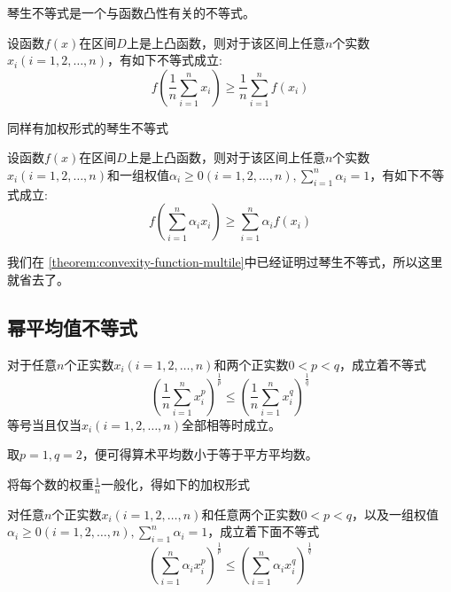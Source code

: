 琴生不等式是一个与函数凸性有关的不等式。
\begin{theorem}[琴生不等式]
  设函数$f(x)$在区间$D$上是上凸函数，则对于该区间上任意$n$个实数$x_i(i=1,2,\ldots,n)$，有如下不等式成立:
  \begin{equation}
    \label{eq:jenson-inequality-some-import-inequality}
    f \left( \frac{1}{n} \sum_{i=1}^nx_i \right) \geqslant
    \frac{1}{n} \sum_{i=1}^n f(x_i)
  \end{equation}
\end{theorem}

同样有加权形式的琴生不等式
\begin{theorem}[加权形式的琴生不等式]
  设函数$f(x)$在区间$D$上是上凸函数，则对于该区间上任意$n$个实数$x_i(i=1,2,\ldots,n)$和一组权值$\alpha_i\geqslant 0(i=1,2,\ldots,n), \sum_{i=1}^n\alpha_i=1$，有如下不等式成立:
  \begin{equation}
    \label{eq:jenson-inequality-with-weight}
    f \left( \sum_{i=1}^n\alpha_ix_i \right) \geqslant
    \sum_{i=1}^n \alpha_if(x_i)
  \end{equation}
\end{theorem}

我们在 \autoref{theorem:convexity-function-multile}中已经证明过琴生不等式，所以这里就省去了。

\subsection{幂平均值不等式}

\begin{theorem}[幂平均值不等式]
  对于任意$n$个正实数$x_i(i=1,2,\ldots,n)$和两个正实数$0<p<q$，成立着不等式
  \begin{equation}
    \label{eq:pow-mean-inequation}
    \left( \frac{1}{n}\sum_{i=1}^nx_i^{p} \right)^{\frac{1}{p}}
    \leqslant \left( \frac{1}{n}\sum_{i=1}^nx_i^{q} \right)^{\frac{1}{q}}
  \end{equation}
  等号当且仅当$x_i(i=1,2,\ldots,n)$全部相等时成立。
\end{theorem}
取$p=1,q=2$，便可得算术平均数小于等于平方平均数。

将每个数的权重$\frac{1}{n}$一般化，得如下的加权形式
\begin{theorem}[加权幂平均值不等式]
  对任意$n$个正实数$x_i(i=1,2,\ldots,n)$和任意两个正实数$0<p<q$，以及一组权值$\alpha_i \geqslant 0(i=1,2,\ldots,n), \sum_{i=1}^n\alpha_i=1$，成立着下面不等式
  \begin{equation}
    \label{eq:pow-mean-inequation-with-weight}
    \left( \sum_{i=1}^n\alpha_ix_i^p \right)^{\frac{1}{p}}
    \leqslant \left( \sum_{i=1}^n\alpha_ix_i^q \right)^{\frac{1}{q}}
  \end{equation}
\end{theorem}

